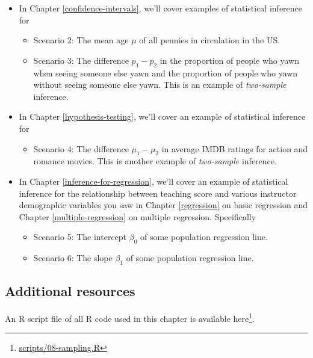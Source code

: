 \documentclass[12pt, krantz2,]{krantz}
\providecommand{\tightlist}{%
  \setlength{\itemsep}{0pt}\setlength{\parskip}{0pt}}
\renewcommand{\href}[2]{#2\footnote{\url{#1}}}
\begin{document}
\begin{itemize}
\tightlist
\item
  In Chapter \ref{confidence-intervals}, we'll cover examples of statistical inference for

  \begin{itemize}
  \tightlist
  \item
    Scenario 2: The mean age \(\mu\) of all pennies in circulation in the US.
  \item
    Scenario 3: The difference \(p_1 - p_2\) in the proportion of people who yawn when seeing someone else yawn and the proportion of people who yawn without seeing someone else yawn. This is an example of \emph{two-sample} inference.
  \end{itemize}
\item
  In Chapter \ref{hypothesis-testing}, we'll cover an example of statistical inference for

  \begin{itemize}
  \tightlist
  \item
    Scenario 4: The difference \(\mu_1 - \mu_2\) in average IMDB ratings for action and romance movies. This is another example of \emph{two-sample} inference.
  \end{itemize}
\item
  In Chapter \ref{inference-for-regression}, we'll cover an example of statistical inference for the relationship between teaching score and various instructor demographic variables you saw in Chapter \ref{regression} on basic regression and Chapter \ref{multiple-regression} on multiple regression. Specifically

  \begin{itemize}
  \tightlist
  \item
    Scenario 5: The intercept \(\beta_0\) of some population regression line.
  \item
    Scenario 6: The slope \(\beta_1\) of some population regression line.
  \end{itemize}
\end{itemize}

\hypertarget{additional-resources-6}{%
\subsection{Additional resources}\label{additional-resources-6}}

An R script file of all R code used in this chapter is available \href{scripts/08-sampling.R}{here}.
\end{document}
